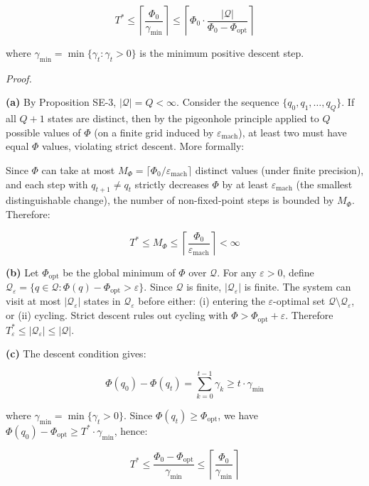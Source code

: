 \documentclass[
  12pt,
]{article}
\begin{document}
\[T^* \leq \left\lceil \frac{\Phi_0}{\gamma_{\min}} \right\rceil \leq \left\lceil \Phi_0 \cdot \frac{|\mathcal{Q}|}{\Phi_0 - \Phi_{\text{opt}}} \right\rceil\]

where \(\gamma_{\min} = \min\{\gamma_t : \gamma_t > 0\}\) is the minimum
positive descent step.

\emph{Proof.}

\textbf{(a)} By Proposition SE-3, \(|\mathcal{Q}| = Q < \infty\).
Consider the sequence \(\{q_0, q_1, \ldots, q_Q\}\). If all \(Q+1\)
states are distinct, then by the pigeonhole principle applied to \(Q\)
possible values of \(\Phi\) (on a finite grid induced by
\(\varepsilon_{\text{mach}}\)), at least two must have equal \(\Phi\)
values, violating strict descent. More formally:

Since \(\Phi\) can take at most
\(M_\Phi = \lceil \Phi_0/\varepsilon_{\text{mach}} \rceil\) distinct
values (under finite precision), and each step with \(q_{t+1} \neq q_t\)
strictly decreases \(\Phi\) by at least \(\varepsilon_{\text{mach}}\)
(the smallest distinguishable change), the number of non-fixed-point
steps is bounded by \(M_\Phi\). Therefore:

\[T^* \leq M_\Phi \leq \left\lceil \frac{\Phi_0}{\varepsilon_{\text{mach}}} \right\rceil < \infty\]

\textbf{(b)} Let \(\Phi_{\text{opt}}\) be the global minimum of \(\Phi\)
over \(\mathcal{Q}\). For any \(\varepsilon > 0\), define
\(\mathcal{Q}_\varepsilon = \{q \in \mathcal{Q} : \Phi(q) - \Phi_{\text{opt}} > \varepsilon\}\).
Since \(\mathcal{Q}\) is finite, \(|\mathcal{Q}_\varepsilon|\) is
finite. The system can visit at most \(|\mathcal{Q}_\varepsilon|\)
states in \(\mathcal{Q}_\varepsilon\) before either: (i) entering the
\(\varepsilon\)-optimal set
\(\mathcal{Q} \setminus \mathcal{Q}_\varepsilon\), or (ii) cycling.
Strict descent rules out cycling with
\(\Phi > \Phi_{\text{opt}} + \varepsilon\). Therefore
\(T_\varepsilon^* \leq |\mathcal{Q}_\varepsilon| \leq |\mathcal{Q}|\).

\textbf{(c)} The descent condition gives:

\[\Phi(q_0) - \Phi(q_t) = \sum_{k=0}^{t-1} \gamma_k \geq t \cdot \gamma_{\min}\]

where \(\gamma_{\min} = \min\{\gamma_t > 0\}\). Since
\(\Phi(q_t) \geq \Phi_{\text{opt}}\), we have
\(\Phi(q_0) - \Phi_{\text{opt}} \geq T^* \cdot \gamma_{\min}\), hence:

\[T^* \leq \frac{\Phi_0 - \Phi_{\text{opt}}}{\gamma_{\min}} \leq \left\lceil \frac{\Phi_0}{\gamma_{\min}} \right\rceil\]
\end{document}
